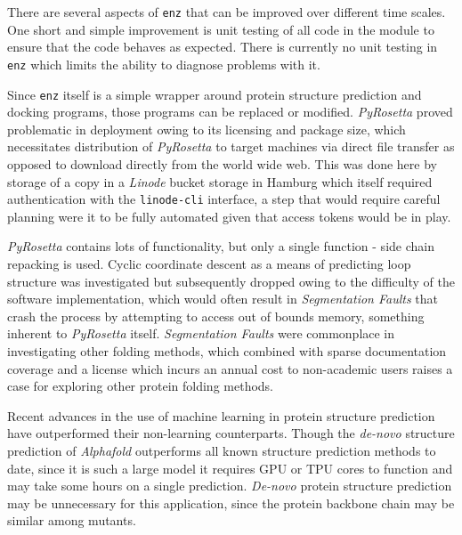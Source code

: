 \documentclass[16pt]{book}
\begin{document}
There are several aspects of \texttt{enz} that can be improved over different time scales.
One short and simple improvement is unit testing of all code in the module to ensure that the code behaves as expected.
There is currently no unit testing in \texttt{enz} which limits the ability to diagnose problems with it.

Since \texttt{enz} itself is a simple wrapper around protein structure prediction and docking programs, those programs can be replaced or modified.
\textit{PyRosetta} proved problematic in deployment owing to its licensing and package size, which necessitates distribution of \textit{PyRosetta} to target machines via direct file transfer as opposed to download directly from the world wide web.
This was done here by storage of a copy in a \textit{Linode} bucket storage in Hamburg which itself required authentication with the \texttt{linode-cli} interface, a step that would require careful planning were it to be fully automated given that access tokens would be in play.

\textit{PyRosetta} contains lots of functionality, but only a single function - side chain repacking \cite{dunbrack1993backbone} is used. 
Cyclic coordinate descent as a means of predicting loop structure \cite{canutescu2003cyclic} was investigated but subsequently dropped owing to the difficulty of the software implementation, which would often result in \textit{Segmentation Faults} that crash the process by attempting to access out of bounds memory, something inherent to \textit{PyRosetta} itself.
\textit{Segmentation Faults} were commonplace in investigating other folding methods, which combined with sparse documentation coverage and a license which incurs an annual cost to non-academic users raises a case for exploring other protein folding methods.

Recent advances in the use of machine learning in protein structure prediction \cite{jumper2021highly} have outperformed their non-learning counterparts.
Though the \textit{de-novo} structure prediction of \textit{Alphafold} \cite{jumper2021highly} outperforms all known structure prediction methods to date, since it is such a large model it requires GPU or TPU cores to function and may take some hours on a single prediction. 
\textit{De-novo} protein structure prediction may be unnecessary for this application, since the protein backbone chain may be similar among mutants.
\end{document}
